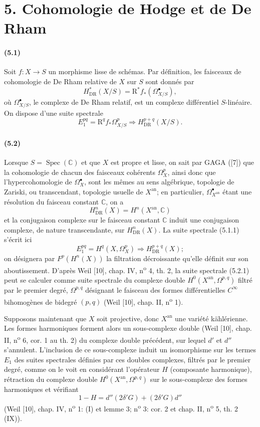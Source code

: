 \documentclass[10pt]{article}
\newcommand{\R}{\mathrm R}
\providecommand{\C}{\mathbb C}
\providecommand{\Spec}{\operatorname{Spec}}
\providecommand{\DR}{\operatorname{DR}}
\providecommand{\an}{\mathrm{an}}
\begin{document}
\section*{5. Cohomologie de Hodge et de De Rham}

\paragraph{(5.1)} Soit $f:X\to S$ un morphisme lisse de schémas. Par définition, les faisceaux de cohomologie de De Rham relative de $X$ sur $S$ sont donnés par
\[
H_{\DR}^*(X/S)=\R^*f_*(\Omega_{X/S}^\bullet),
\]
où $\Omega_{X/S}^\bullet$, le complexe de De Rham relatif, est un complexe différentiel $S$-linéaire. On dispose d'une suite spectrale
\[
\tag{5.1.1}
E_1^{pq}=\R^qf_*\Omega_{X/S}^p\Longrightarrow H_{\DR}^{p+q}(X/S).
\]

\paragraph{(5.2)} Lorsque $S=\Spec(\C)$ et que $X$ est propre et lisse, on sait par GAGA ([7]) que la cohomologie de chacun des faisceaux cohérents $\Omega_X^p$, ainsi donc que l'hypercohomologie de $\Omega_X^\bullet$, sont les mêmes au sens algébrique, topologie de Zariski, ou transcendant, topologie usuelle de $X^{\an}$; en particulier, $\Omega_{X^{\an}}^\bullet$ étant une résolution du faisceau constant $\C$, on a
\[
H_{\DR}^n(X)=H^n(X^{\an},\C)
\]
et la conjugaison complexe sur le faisceau constant $\C$ induit une conjugaison complexe, de nature transcendante, sur $H_{\DR}^n(X)$. La suite spectrale (5.1.1) s'écrit ici
\[
\tag{5.2.1}
E_1^{pq}=H^q(X,\Omega_X^p)\Longrightarrow H_{\DR}^{p+q}(X);
\]
on désignera par $F^p(H^n(X))$ la filtration décroissante qu'elle définit sur son aboutissement. D'après Weil [10], chap. IV, n\textsuperscript{o} 4, th. 2, la suite spectrale (5.2.1) peut se calculer comme suite spectrale du complexe double $H^0(X^{\an},\Omega^{p,q})$ filtré par le premier degré, $\Omega^{p,q}$ désignant le faisceau des formes différentielles $C^\infty$ bihomogènes de bidegré $(p,q)$ (Weil [10], chap. II, n\textsuperscript{o} 1).

Supposons maintenant que $X$ soit projective, donc $X^{\an}$ une variété kählérienne. Les formes harmoniques forment alors un sous-complexe double (Weil [10], chap. II, n\textsuperscript{o} 6, cor. 1 au th. 2) du complexe double précédent, sur lequel $d'$ et $d''$ s'annulent. L'inclusion de ce sous-complexe induit un isomorphisme sur les termes $E_1$ des suites spectrales définies par ces doubles complexes, filtrés par le premier degré, comme on le voit en considérant l'opérateur $H$ (composante harmonique), rétraction du complexe double $H^0(X^{\an},\Omega^{p,q})$ sur le sous-complexe des formes harmoniques et vérifiant
\[
1-H=d''(2\delta'G)+(2\delta'G)d''
\]
(Weil [10], chap. IV, n\textsuperscript{o} 1: (I) et lemme 3; n\textsuperscript{o} 3: cor. 2 et chap. II, n\textsuperscript{o} 5, th. 2 (IX)).
\end{document}
